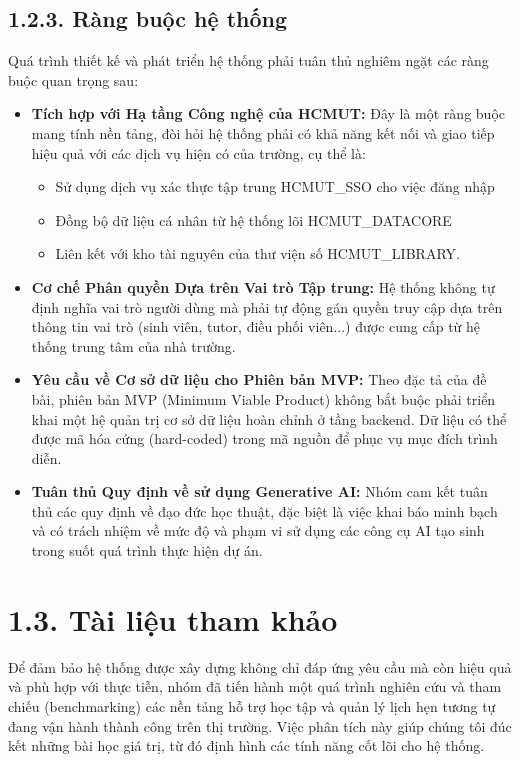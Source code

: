 \subsection*{1.2.3. Ràng buộc hệ thống}
Quá trình thiết kế và phát triển hệ thống phải tuân thủ nghiêm ngặt các ràng buộc quan trọng sau:
\begin{itemize}
    \item \textbf{Tích hợp với Hạ tầng Công nghệ của HCMUT:} Đây là một ràng buộc mang tính nền tảng, đòi hỏi hệ thống phải có khả năng kết nối và giao tiếp hiệu quả với các dịch vụ hiện có của trường, cụ thể là:

    \begin{itemize}
        \item Sử dụng dịch vụ xác thực tập trung HCMUT\_SSO cho việc đăng nhập
        \item Đồng bộ dữ liệu cá nhân từ hệ thống lõi HCMUT\_DATACORE
        \item Liên kết với kho tài nguyên của thư viện số HCMUT\_LIBRARY.
    \end{itemize}
    \item \textbf{Cơ chế Phân quyền Dựa trên Vai trò Tập trung:} Hệ thống không tự định nghĩa vai trò người dùng mà phải tự động gán quyền truy cập dựa trên thông tin vai trò (sinh viên, tutor, điều phối viên...) được cung cấp từ hệ thống trung tâm của nhà trường.
    \item \textbf{Yêu cầu về Cơ sở dữ liệu cho Phiên bản MVP:} Theo đặc tả của đề bài, phiên bản MVP (Minimum Viable Product) không bắt buộc phải triển khai một hệ quản trị cơ sở dữ liệu hoàn chỉnh ở tầng backend. Dữ liệu có thể được mã hóa cứng (hard-coded) trong mã nguồn để phục vụ mục đích trình diễn.
    \item \textbf{Tuân thủ Quy định về sử dụng Generative AI:} Nhóm cam kết tuân thủ các quy định về đạo đức học thuật, đặc biệt là việc khai báo minh bạch và có trách nhiệm về mức độ và phạm vi sử dụng các công cụ AI tạo sinh trong suốt quá trình thực hiện dự án.

\end{itemize}


\section*{1.3. Tài liệu tham khảo}
Để đảm bảo hệ thống được xây dựng không chỉ đáp ứng yêu cầu mà còn hiệu quả và phù hợp với thực tiễn, nhóm đã tiến hành một quá trình nghiên cứu và tham chiếu (benchmarking) các nền tảng hỗ trợ học tập và quản lý lịch hẹn tương tự đang vận hành thành công trên thị trường. Việc phân tích này giúp chúng tôi đúc kết những bài học giá trị, từ đó định hình các tính năng cốt lõi cho hệ thống.

